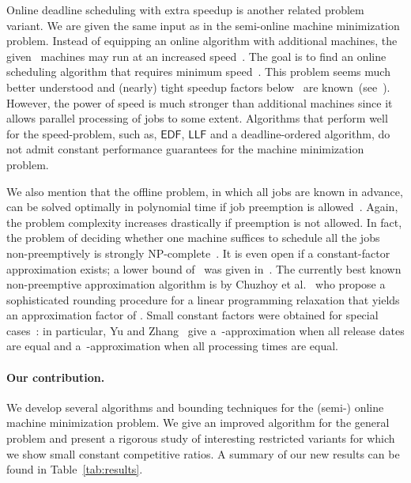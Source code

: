 \documentclass[letterpaper,11pt]{article}
\newcommand{\EDF}{\ensuremath{\mathsf{EDF}}\xspace}
\newcommand{\LLF}{\ensuremath{\mathsf{LLF}}\xspace}
\begin{document}
Online deadline scheduling with extra speedup is another related
problem variant. We are given the same input as in the semi-online
machine minimization problem. Instead of equipping an online algorithm
with additional machines, the given~ machines may run at an increased
speed~. The goal is to find an online scheduling algorithm that requires
minimum speed~.  This problem seems much better understood and
(nearly) tight speedup factors below~ are
known~(see~\cite{phillipsSTW02,lamT99,anandGM11}). However, the power
of speed is much stronger than additional machines since it allows
parallel processing of jobs to some extent. Algorithms that perform
well for the speed-problem, such as, \EDF, \LLF and a deadline-ordered
algorithm, do not admit constant performance guarantees for the
machine minimization problem.

We also mention that the offline problem, in
which all jobs are known in advance, can be solved
optimally in polynomial time if job preemption is allowed~\cite{horn74}. Again, the problem complexity increases drastically if
preemption is not allowed. In fact, the problem of  deciding whether
one machine suffices to schedule all the jobs non-preemptively is strongly
NP-complete~\cite{GareyJ77}. It is even open if a constant-factor
approximation exists; a lower bound of~ was given
in~\cite{CieliebakEHWW04}. The currently best known non-preemptive approximation algorithm
is by Chuzhoy et al.~\cite{ChuzhoyGKN04} who propose a sophisticated
rounding procedure for a linear
programming relaxation that yields an approximation factor of . Small constant factors were obtained for special
cases~\cite{CieliebakEHWW04,YuZ09}: in particular, Yu and Zhang~\cite{YuZ09}
give a~-approximation when all release dates are equal and
a~-approximation when all processing times are equal.

\paragraph{Our contribution.} We develop several algorithms and
bounding techniques for the (semi-) online machine minimization
problem. We give an improved algorithm for the general problem and present a rigorous study of interesting restricted
variants for which we show small constant competitive ratios. A summary of our new results can be found in Table~\ref{tab:results}.
\end{document}
